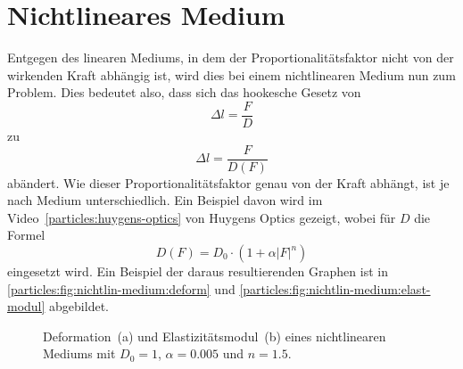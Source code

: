 %
%
%
%
\section{Nichtlineares Medium
\label{particles:section:nichtlinear}}
Entgegen des linearen Mediums, in dem der Proportionalitätsfaktor nicht von der wirkenden Kraft abhängig ist, 
wird dies bei einem nichtlinearen Medium nun zum Problem.
Dies bedeutet also, dass sich das hookesche Gesetz von 
\[
    \Delta l
    = 
    \frac{F}{D}
\]
zu
\[
    \Delta l
    = 
    \frac{F}{D(F)}
\]
abändert. 
Wie dieser Proportionalitätsfaktor genau von der Kraft abhängt, ist je nach Medium unterschiedlich.
Ein Beispiel davon wird im Video~\ref{particles:huygens-optics} von Huygens Optics gezeigt, wobei für $D$ die Formel 
\[
    D(F)
    =
    D_0
    \cdot
    (1 + \alpha |F|^n)
\]
eingesetzt wird. Ein Beispiel der daraus resultierenden Graphen ist in \autoref{particles:fig:nichtlin-medium:deform} und \autoref{particles:fig:nichtlin-medium:elast-modul} abgebildet.
\begin{figure}
    \centering
    \hfill
    \caption{Deformation~(a) und Elastizitätsmodul~(b) eines nichtlinearen Mediums mit $D_0 = 1$, $\alpha = 0.005$ und $n = 1.5$.}
\end{figure}

